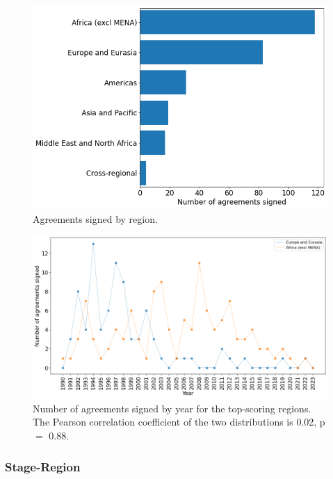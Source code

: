 \documentclass{article}
\begin{document}
\begin{figure}[H]
\begin{center}
\includegraphics[scale=0.40]{./assets/figure_9.png}
\caption{Agreements signed by region.}
\end{center}
\end{figure}

\begin{figure}[H]
\begin{center}
\includegraphics[scale=0.36]{./assets/figure_12.png}
\caption{Number of agreements signed by year for the top-scoring regions. The Pearson correlation coefficient of the two distributions is 0.02, p $=$ 0.88.}
\end{center}
\end{figure}

\pagebreak
\subsubsection{Stage-Region}
\end{document}
